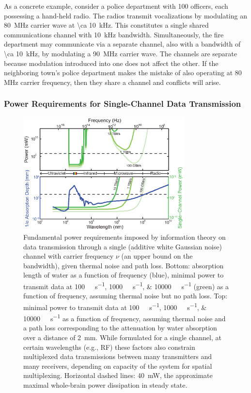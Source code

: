 As a concrete example, consider a police department with \num{100} officers, each possessing a hand-held radio.
The radios transmit vocalizations by modulating an \SI{80}{\mega\hertz} carrier wave at \SI{\ca 10}{\kilo\hertz}.
This constitutes a single shared communications channel with \SI{10}{\kilo\hertz} bandwidth.
Simultaneously, the fire department may communicate via a separate channel, also with a bandwidth of \SI{\ca 10}{\kilo\hertz}, by modulating a \SI{90}{\mega\hertz} carrier wave.
The channels are separate because modulation introduced into one does not affect the other.
If the neighboring town's police department makes the mistake of also operating at 80 MHz carrier frequency, then they share a channel and conflicts will arise.

\subsubsection{Power Requirements for Single-Channel Data Transmission}

\begin{figure}[htbp]
\caption{%
Fundamental power requirements imposed by information theory on data transmission through a single (additive white Gaussian noise) channel with carrier frequency $\nu$ (an upper bound on the bandwidth), given thermal noise and path loss.
Bottom: absorption length of water as a function of frequency (blue), minimal power to transmit data at \SIlist{100;1000;10000}{\giga\bit\per\second} (green) as a function of frequency, assuming thermal noise but no path loss.
Top: minimal power to transmit data at \SIlist{100;1000;10000}{\giga\bit\per\second} as a function of frequency, assuming thermal noise and a path loss corresponding to the attenuation by water absorption over a distance of \SI{2}{\milli\meter}.
While formulated for a single channel, at certain wavelengths (e.g., RF) these factors also constrain multiplexed data transmissions between many transmitters and many receivers, depending on capacity of the system for spatial multiplexing.
Horizontal dashed lines: \SI{40}{\milli\watt}, the approximate maximal whole-brain power dissipation in steady state.
}
\label{fig:rfpower}
\centering
\includegraphics[width=0.78\textwidth]{figs/Fig5.eps}
\end{figure}

